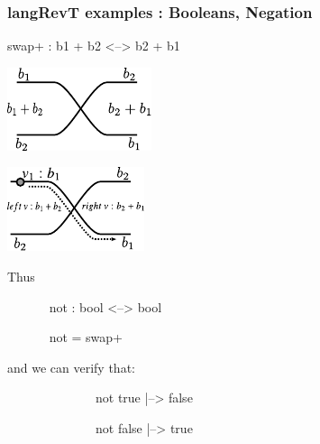 \documentclass[svgnames,11pt]{beamer}
\begin{document}
\begin{frame}
\frametitle{ {{langRevT}} examples : Booleans, Negation  }

\vfill


 

\begin{center}
  {{swap+ : b1 + b2 <--> b2 + b1}}
\end{center}

\begin{multicols}{2}
\begin{center}
  \includegraphics{diagrams/thesis/swap_plus.pdf}
\end{center}


\begin{center}
  \includegraphics{diagrams/thesis/swap_plus_value.pdf}
\end{center}
  
\end{multicols}

\pause

\begin{small}
  \begin{multicols}{2}

    Thus

    {{~~~~~~ not : bool <--> bool }}

    {{~~~~~~ not = swap+}} 

    and we can verify that: 

    {{~~~~~~~~~~~~~~not true |--> false}}

    {{~~~~~~~~~~~~~~not false |--> true}}

    
  \end{multicols}
\end{small}


\end{frame}
\end{document}
